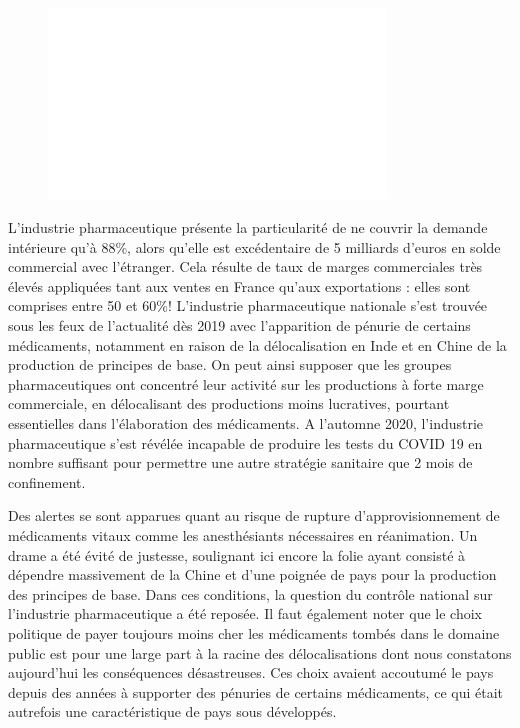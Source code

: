 \documentclass[a4paper]{article}
\begin{document}
\begin{figure}[H]
    \centering
    \includegraphics*[width=0.8\textwidth]{images/etp5}
    \label{fig:etp5}
\end{figure}

L’industrie pharmaceutique présente la particularité de ne couvrir la demande intérieure qu’à 88\%, alors qu’elle est excédentaire de 5 milliards d'euros en solde commercial avec l’étranger.  Cela résulte de taux de marges commerciales très élevés appliquées tant aux ventes en France qu’aux exportations : elles sont comprises entre 50 et 60\%! L’industrie pharmaceutique nationale s’est trouvée sous les feux de l’actualité dès 2019 avec l’apparition de pénurie de certains médicaments, notamment en raison de la délocalisation en Inde et en Chine de la production de principes de base. On peut ainsi supposer que les groupes pharmaceutiques ont concentré leur activité sur les productions à forte marge commerciale, en délocalisant des productions moins lucratives, pourtant essentielles dans l’élaboration des médicaments. A l’automne 2020, l’industrie pharmaceutique s’est révélée incapable de produire les tests du COVID 19 en nombre suffisant pour permettre une autre stratégie sanitaire que 2 mois de confinement. 

Des alertes se sont apparues quant au risque de rupture d’approvisionnement de médicaments vitaux comme les anesthésiants nécessaires en réanimation. Un drame a été évité de justesse, soulignant ici encore la folie ayant consisté à dépendre massivement de la Chine et d’une poignée de pays pour la production des principes de base. Dans ces conditions, la question du contrôle national sur l’industrie pharmaceutique a été reposée.
Il faut également noter que le choix politique de payer toujours moins cher les médicaments tombés dans le domaine public est pour une large part à la racine des délocalisations dont nous constatons aujourd’hui les conséquences désastreuses. Ces choix avaient accoutumé le pays depuis des années à supporter des pénuries de certains médicaments, ce qui était autrefois une caractéristique de pays sous développés. 
\end{document}
